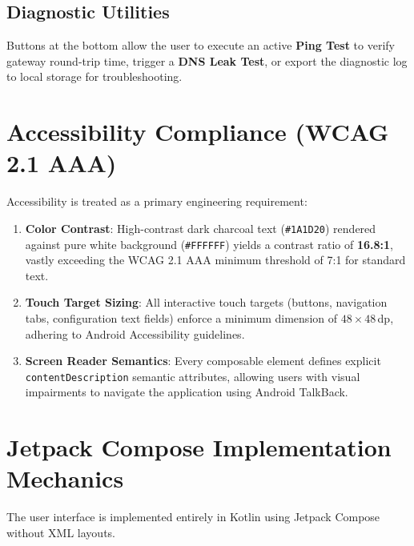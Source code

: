 \subsection{Diagnostic Utilities}
Buttons at the bottom allow the user to execute an active \textbf{Ping Test} to verify gateway round-trip time, trigger a \textbf{DNS Leak Test}, or export the diagnostic log to local storage for troubleshooting.

\section{Accessibility Compliance (WCAG 2.1 AAA)}
\label{sec:accessibility_compliance}

Accessibility is treated as a primary engineering requirement:
\begin{enumerate}
    \item \textbf{Color Contrast}: High-contrast dark charcoal text (\texttt{\#1A1D20}) rendered against pure white background (\texttt{\#FFFFFF}) yields a contrast ratio of \textbf{16.8:1}, vastly exceeding the WCAG 2.1 AAA minimum threshold of 7:1 for standard text.
    \item \textbf{Touch Target Sizing}: All interactive touch targets (buttons, navigation tabs, configuration text fields) enforce a minimum dimension of $48 \times 48$\,dp, adhering to Android Accessibility guidelines.
    \item \textbf{Screen Reader Semantics}: Every composable element defines explicit \texttt{contentDescription} semantic attributes, allowing users with visual impairments to navigate the application using Android TalkBack.
\end{enumerate}

\section{Jetpack Compose Implementation Mechanics}
\label{sec:compose_implementation_mechanics}

The user interface is implemented entirely in Kotlin using Jetpack Compose without XML layouts.


